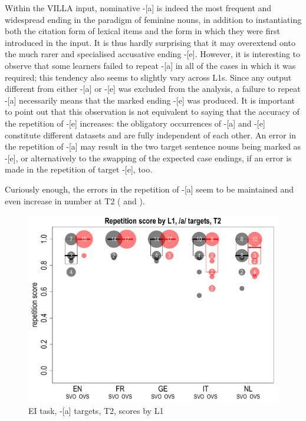 Within the VILLA input, nominative -[a] is indeed the most frequent and widespread ending in the paradigm of feminine nouns, in addition to instantiating both the citation form of lexical items and the form in which they were first introduced in the input. It is thus hardly surprising that it may overextend onto the much rarer and specialised accusative ending -[e]. However, it is interesting to observe that some learners failed to repeat -[a] in all of the cases in which it was required; this tendency also seems to slightly vary across L1s. Since any output different from either -[a] or -[e] was excluded from the analysis, a failure to repeat -[a] necessarily means that the marked ending -[e] was produced. It is important to point out that this observation is not equivalent to saying that the accuracy of the repetition of -[e] increases: the obligatory occurrences of -[a] and -[e] constitute different datasets and are fully independent of each other. An error in the repetition of -[a] may result in the two target sentence nouns being marked as -[e], or alternatively to the swapping of the expected case endings, if an error is made in the repetition of target -[e], too.


Curiously enough, the errors in the repetition of -[a] seem to be maintained and even increase in number at T2 ( and ).

\begin{figure}[t]
    \includegraphics[width=.9\textwidth]{figures/04-7.pdf}
    \caption{EI task, -[a] targets, T2, scores by L1}
    \label{fig:04:7}
\end{figure}

